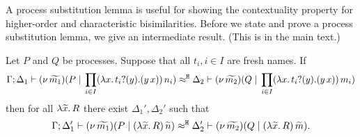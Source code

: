A process substitution lemma is useful for showing the
contextuality property for higher-order and characteristic bisimilarities.
Before we state and prove a process substitution lemma,
we give an intermediate result.
(This is  in the main text.)

\begin{lemma}
	\label{lem:trigger_subst}
	Let $P$ and $Q$ be processes. Suppose that all $t_i, i \in I$ are fresh names. If
	\[
		\Gamma; \Delta_1 \vdash (\nu\, \widetilde{m_1})(P \;|\; \prod_{i \in I} (\lambda x.\,t_i ? (y) . (y\, {x}))\, {n_i} ) \approx^\mathtt{H} \Delta_2 \vdash (\nu\, \widetilde{m_2})(Q \;|\;\prod_{i \in I} (\lambda x.\,t_i ? (y) . (y\, {x}))\, {m_i} )
	\]
	then for all $\lambda \widetilde{x}.\,R$ there exist $\Delta_1', \Delta_2'$ such that
	\[
		\Gamma; \Delta_1' \vdash (\nu\, \widetilde{m_1})(P \;|\; (\lambda \widetilde{x}.\,R)\, {\widetilde{n}} ) \approx^\mathtt{H} \Delta_2' \vdash (\nu\, \widetilde{m_2})(Q \;|\; (\lambda \widetilde{x}.\,R)\, {\widetilde{m}} ).
	\]
\end{lemma}


